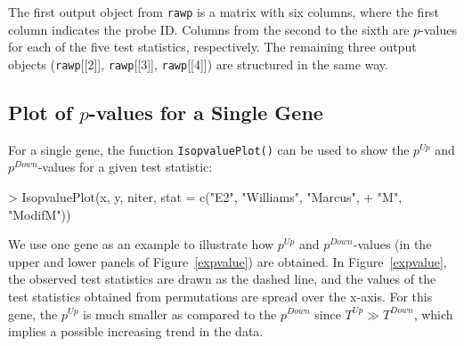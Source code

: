 \documentclass[10pt]{mybook4}
\begin{document}
The first output object from \texttt{rawp} is a matrix with six
columns, where the first column indicates the probe ID. Columns from
the second to the sixth are $p$-values for each of the five test
statistics, respectively. The remaining three output objects
(\texttt{rawp}[[2]], \texttt{rawp}[[3]], \texttt{rawp}[[4]]) are
structured in the same way.


\subsection{Plot of $p$-values for a Single Gene}

For a single gene, the function \texttt{IsopvaluePlot()} can be used
to show the $p^{Up}$ and $p^{Down}$-values for a given test
statistic:

\begin{Schunk}
\begin{Sinput}
> IsopvaluePlot(x, y, niter, stat = c("E2", "Williams", "Marcus", 
+     "M", "ModifM"))
\end{Sinput}
\end{Schunk}


We use one gene as an example to illustrate how $p^{Up}$ and
$p^{Down}$-values (in the upper and lower panels of
Figure~\ref{expvalue}) are obtained. In Figure~\ref{expvalue}, the
observed test statistics are drawn as the dashed line, and the
values of the test statistics obtained from permutations are spread
over the x-axis. For this gene, the $p^{Up}$ is much smaller as
compared to the $p^{Down}$ since $T^{Up} \gg T^{Down}$, which
implies a possible increasing trend in the data.
\end{document}
